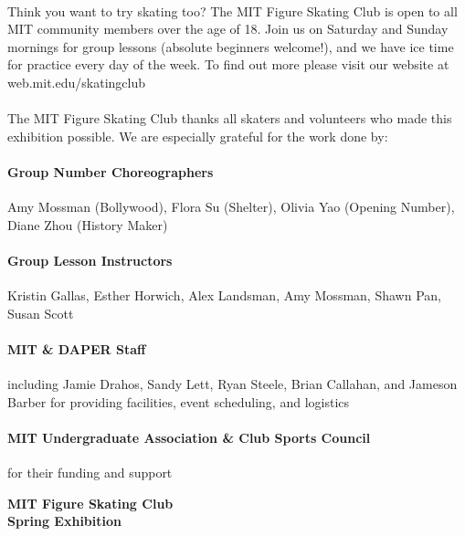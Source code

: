 \documentclass[12pt]{article}
\begin{document}
\begin{multicols*}{2}


\paragraph{} Think you want to try skating too? The MIT Figure Skating Club is open to all MIT community members over the age of 18. Join us on Saturday and Sunday mornings for group lessons (absolute beginners welcome!), and we have ice time for practice every day of the week. To find out more please visit our website at web.mit.edu/skatingclub

\paragraph{} The MIT Figure Skating Club thanks all skaters and volunteers who made this exhibition possible. We are especially grateful for the work done by:

\paragraph{Group Number Choreographers} Amy Mossman (Bollywood), Flora Su (Shelter), Olivia Yao (Opening Number), Diane Zhou (History Maker)
\paragraph{Group Lesson Instructors} Kristin Gallas, Esther Horwich, Alex Landsman, Amy Mossman, Shawn Pan, Susan Scott
\paragraph{MIT \& DAPER Staff} including Jamie Drahos, Sandy Lett, Ryan Steele, Brian Callahan, and Jameson Barber for providing facilities, event scheduling, and logistics
\paragraph{MIT Undergraduate Association \& Club Sports Council} for their funding and support

\vfill\null
\columnbreak


\begin{center}

\vspace*{1.5in}

{\Large \textbf{MIT Figure Skating Club}}\\
{\Large \textbf{Spring Exhibition}}


\end{center}
\end{multicols*}
\end{document}
